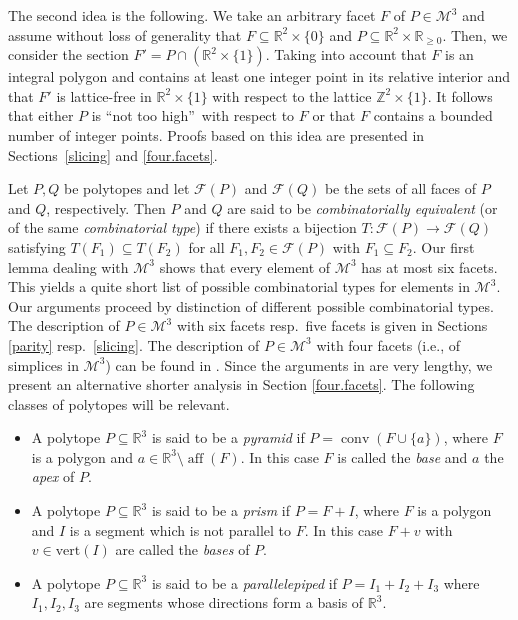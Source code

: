 \documentclass[a4paper]{article}
\theoremstyle{plain}
\begin{document}
The second idea is the following.
We take an arbitrary facet $F$ of $P \in {\mathcal{M}^3}$ and assume
without loss of generality that $F \subseteq {\mathbb{R}}^2 \times
\{0\}$ and $P \subseteq {\mathbb{R}}^2 \times {\mathbb{R}}_{\ge 0}$.
Then, we consider the section $F' = P \cap ({\mathbb{R}}^2 \times
\{1\})$.
Taking into account that $F$ is an integral polygon and
contains at least one integer point in its relative interior
and that $F'$ is lattice-free in ${\mathbb{R}}^2 \times \{1\}$ with
respect to the lattice ${\mathbb{Z}}^2 \times \{1\}$. It follows that
either $P$ is \textquotedblleft not too
high\textquotedblright~with respect to $F$ or that $F$
contains a bounded number of integer points.
Proofs based on this idea are presented in
Sections~\ref{slicing} and \ref{four.facets}.

Let $P, Q$ be polytopes and let ${\mathcal{F}}(P)$ and ${\mathcal{F}}(Q)$ be the sets of all faces of $P$ and $Q$, respectively. Then $P$ and $Q$ are said to be
\emph{combinatorially equivalent} (or of the same {\emph{{combinatorial type}}}) if there exists a bijection $T : {\mathcal{F}}(P) \rightarrow {\mathcal{F}}(Q)$ satisfying $T(F_1) \subseteq T(F_2)$ for all $F_1, F_2 \in {\mathcal{F}}(P)$ with $F_1 \subseteq F_2$. Our first lemma dealing with ${\mathcal{M}^3}$ shows that every element of ${\mathcal{M}^3}$ has at most six facets. This yields a quite short list of possible combinatorial types for elements in ${\mathcal{M}^3}$. Our arguments proceed by distinction of different possible combinatorial types. The description of $P \in {\mathcal{M}^3}$ with six facets resp.~five facets is given 
in Sections \ref{parity} resp.~\ref{slicing}. The description of $P \in {\mathcal{M}^3}$ with four facets (i.e., of simplices in ${\mathcal{M}^3}$) can be found in \cite{anwawe}. Since the arguments in \cite{anwawe} are very lengthy, we present an alternative shorter analysis in Section \ref{four.facets}.
The following classes of polytopes will be relevant. 

\begin{itemize} 
  \item A polytope $P \subseteq{\mathbb{R}}^3$ is said to be a
    \emph{pyramid} if $P = {{\mathop{\mathrm{{conv}}}}} (F \cup \{a\})$, where $F$
    is a polygon and $a \in {\mathbb{R}}^3 \setminus {{\mathop{\mathrm{{aff}}}}}(F)$.
    In this case $F$ is called the \emph{base} and $a$ the
    \emph{apex} of $P$.
  \item A polytope $P \subseteq {\mathbb{R}}^3$ is said to be a
    \emph{prism} if $P=F+I$, where $F$ is a polygon and $I$
    is a segment which is not parallel to $F$.
    In this case $F+v$ with $v \in {\mathrm{vert}}(I)$ are called the
    \emph{bases} of $P$.
  \item A polytope $P \subseteq {\mathbb{R}}^3$ is said to be a
    \emph{parallelepiped} if $P=I_1+I_2+I_3$ where $I_1,
    I_2, I_3$ are segments whose directions form a basis of
    ${\mathbb{R}}^3$.
\end{itemize}
\end{document}
